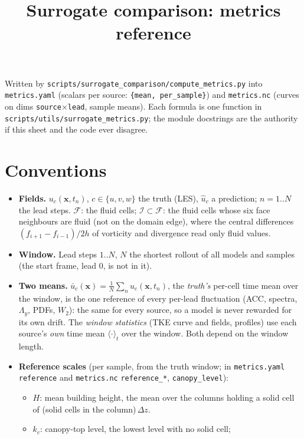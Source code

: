 \documentclass[10pt]{article}
\title{\vspace{-1.2em}Surrogate comparison: metrics reference}
\author{}
\date{\vspace{-3.2em}}
\newcommand{\F}{\mathcal{F}}
\newcommand{\I}{\mathcal{I}}
\newcommand{\pred}[1]{\hat{#1}}
\begin{document}
\maketitle
\vspace{-0.5em}
\noindent Written by \texttt{scripts/surrogate\_comparison/compute\_metrics.py}
into \texttt{metrics.yaml} (scalars per source: \texttt{\{mean, per\_sample\}})
and \texttt{metrics.nc} (curves on dims \texttt{source}$\times$\texttt{lead},
sample means). Each formula is one function in
\texttt{scripts/utils/surrogate\_metrics.py}; the module docstrings are the
authority if this sheet and the code ever disagree.

\section*{Conventions}
\begin{itemize}
\item \textbf{Fields.} $u_c(\mathbf{x}, t_n)$, $c \in \{u, v, w\}$ the truth
  (LES), $\pred{u}_c$ a prediction; $n = 1..N$ the lead steps. $\F$: the fluid
  cells; $\I \subset \F$: the fluid cells whose six face neighbours are fluid
  (not on the domain edge), where the central differences
  $(f_{i+1} - f_{i-1})/2h$ of vorticity and divergence read only fluid values.
\item \textbf{Window.} Lead steps $1..N$, $N$ the shortest rollout of all
  models and samples (the start frame, lead 0, is not in it).
\item \textbf{Two means.} $\bar{u}_c(\mathbf{x}) = \frac1N \sum_n u_c(\mathbf{x},
  t_n)$, the \emph{truth's} per-cell time mean over the window, is the one
  reference of every per-lead fluctuation (ACC, spectra, $\Lambda_y$, PDFs,
  $W_2$): the same for every source, so a model is never rewarded for its own
  drift. The \emph{window statistics} (TKE curve and fields, profiles) use each
  source's \emph{own} time mean $\langle\cdot\rangle_t$ over the window. Both
  depend on the window length.
\item \textbf{Reference scales} (per sample, from the truth window; in
  \texttt{metrics.yaml} \texttt{reference} and \texttt{metrics.nc}
  \texttt{reference\_*}, \texttt{canopy\_level}):
  \begin{itemize}
  \item $H$: mean building height, the mean over the columns holding a solid
    cell of (solid cells in the column)$\,\Delta z$.
  \item $k_c$: canopy-top level, the lowest level with no solid cell;

\end{itemize}
\end{itemize}
\end{document}
